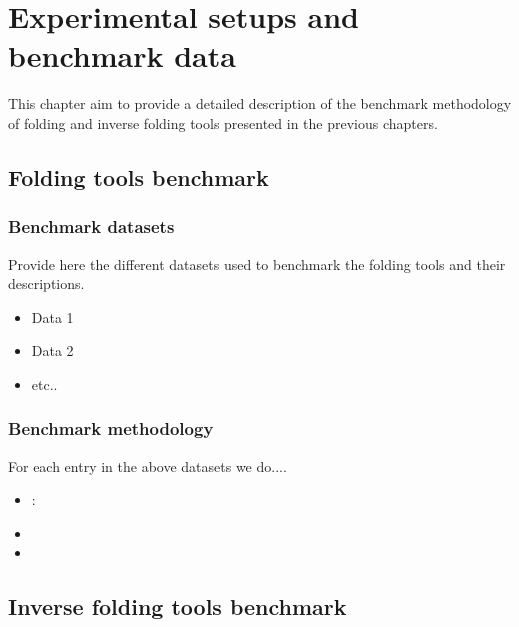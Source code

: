 \chapter{Experimental setups and benchmark data}\label{ch:introduction}
This chapter aim to provide a detailed description of the benchmark methodology of folding and inverse folding tools presented in the previous chapters. 

\section{Folding tools  benchmark}\label{sec:folding_bench}

\subsection{ Benchmark datasets}
Provide here the different datasets used to benchmark the folding tools and their descriptions. 
\begin{itemize}
	\item Data 1
	
	\item Data 2
	
	\item etc.. 
\end{itemize}
\subsection{Benchmark methodology }
For each entry in the above datasets we do.... 
	
	
	\begin{itemize}
		\item:
		
		\item
		
		\item
	\end{itemize}
	


\section{Inverse folding tools  benchmark}\label{sec:folding_bench}

